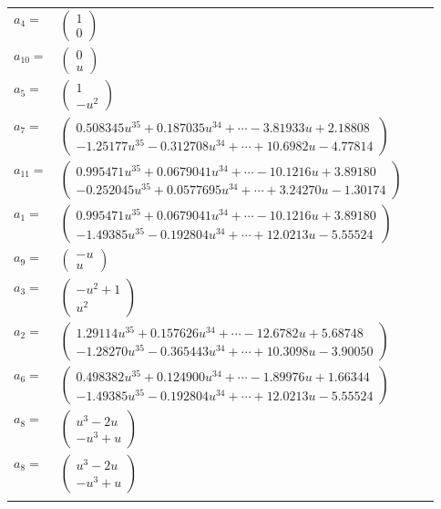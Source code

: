 \documentclass[1p]{elsarticle_modified}
\theoremstyle{definition}
\begin{document}
\begin{tabular}{m{7pt} m{180pt} m{7pt} m{180pt} }
\flushright $a_{4}=$&$\begin{pmatrix}1\\0\end{pmatrix}$ \\
\flushright $a_{10}=$&$\begin{pmatrix}0\\u\end{pmatrix}$ \\
\flushright $a_{5}=$&$\begin{pmatrix}1\\- u^2\end{pmatrix}$ \\
\flushright $a_{7}=$&$\begin{pmatrix}0.508345 u^{35}+0.187035 u^{34}+\cdots-3.81933 u+2.18808\\-1.25177 u^{35}-0.312708 u^{34}+\cdots+10.6982 u-4.77814\end{pmatrix}$ \\
\flushright $a_{11}=$&$\begin{pmatrix}0.995471 u^{35}+0.0679041 u^{34}+\cdots-10.1216 u+3.89180\\-0.252045 u^{35}+0.0577695 u^{34}+\cdots+3.24270 u-1.30174\end{pmatrix}$ \\
\flushright $a_{1}=$&$\begin{pmatrix}0.995471 u^{35}+0.0679041 u^{34}+\cdots-10.1216 u+3.89180\\-1.49385 u^{35}-0.192804 u^{34}+\cdots+12.0213 u-5.55524\end{pmatrix}$ \\
\flushright $a_{9}=$&$\begin{pmatrix}- u\\u\end{pmatrix}$ \\
\flushright $a_{3}=$&$\begin{pmatrix}- u^2+1\\u^2\end{pmatrix}$ \\
\flushright $a_{2}=$&$\begin{pmatrix}1.29114 u^{35}+0.157626 u^{34}+\cdots-12.6782 u+5.68748\\-1.28270 u^{35}-0.365443 u^{34}+\cdots+10.3098 u-3.90050\end{pmatrix}$ \\
\flushright $a_{6}=$&$\begin{pmatrix}0.498382 u^{35}+0.124900 u^{34}+\cdots-1.89976 u+1.66344\\-1.49385 u^{35}-0.192804 u^{34}+\cdots+12.0213 u-5.55524\end{pmatrix}$ \\
\flushright $a_{8}=$&$\begin{pmatrix}u^3-2 u\\- u^3+u\end{pmatrix}$\\ \flushright $a_{8}=$&$\begin{pmatrix}u^3-2 u\\- u^3+u\end{pmatrix}$\\&\end{tabular}
\end{document}
